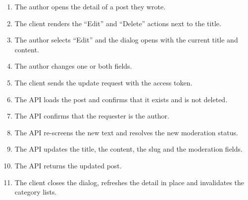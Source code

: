\begin{enumerate}[leftmargin=1.8em,topsep=3pt,itemsep=2pt,parsep=0pt]
      \item The author opens the detail of a post they wrote.
      \item The client renders the ``Edit'' and ``Delete'' actions next to the title.
      \item The author selects ``Edit'' and the dialog opens with the current title and
            content.
      \item The author changes one or both fields.
      \item The client sends the update request with the access token.
      \item The API loads the post and confirms that it exists and is not deleted.
      \item The API confirms that the requester is the author.
      \item The API re-screens the new text and resolves the new moderation status.
      \item The API updates the title, the content, the slug and the moderation fields.
      \item The API returns the updated post.
      \item The client closes the dialog, refreshes the detail in place and invalidates the
            category lists.
\end{enumerate}

